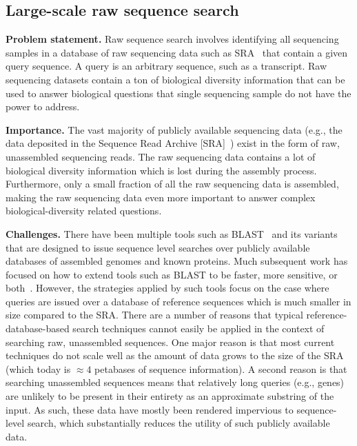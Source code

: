 

\subsection{Large-scale raw sequence search}

{\bf Problem statement.} Raw sequence search involves  identifying all sequencing samples in a database of raw sequencing data such as SRA~\cite{kodama2012sequence} that contain a given query sequence. A query is an arbitrary sequence, such as a transcript. Raw sequencing datasets contain a ton of biological diversity information that can be used to answer biological questions that single sequencing sample do not have the power to address.

\noindent
{\bf Importance.}
The vast majority of publicly available sequencing data (e.g., the data deposited in the Sequence Read Archive [SRA]~\cite{kodama2012sequence}) exist in the form of raw, unassembled sequencing reads. The raw sequencing data contains a lot of biological diversity information which is lost during the assembly process. Furthermore, only a small fraction of all the raw sequencing data is assembled, making the raw sequencing data even more important to answer complex biological-diversity related questions. 

\noindent
{\bf Challenges.}
There have been multiple tools such as BLAST~\cite{altschul1990basic} and its variants that are designed to issue  sequence level searches over publicly available databases of assembled genomes and known proteins. Much subsequent work has focused on how to extend tools such as BLAST to be faster, more sensitive, or both~\cite{XXX}.   However, the strategies applied by such tools focus on the case where queries are issued over a database of reference sequences which is much smaller in size compared to the SRA. 
%
There are a number of reasons that typical reference-database-based search techniques cannot easily be applied in the context of searching raw, unassembled sequences. One major reason is that most current techniques do not scale well as the amount of data grows to the size of the SRA (which today is $\approx4$ petabases of sequence information). A second reason is that searching unassembled sequences means that relatively long queries (e.g., genes) are unlikely to be present in their entirety as an approximate substring of the input.
As such, these data have mostly been rendered impervious to sequence-level search, which substantially reduces the utility of such publicly available data.


